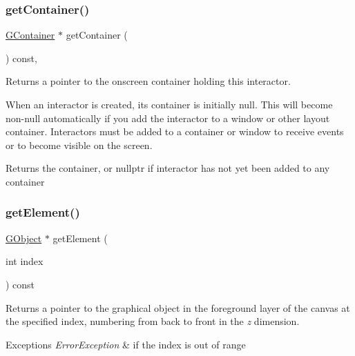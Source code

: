 \subsubsection{\texorpdfstring{get\+Container()}{getContainer()}}
{\footnotesize\ttfamily \mbox{\hyperlink{classGContainer}{G\+Container}} $\ast$ get\+Container (\begin{DoxyParamCaption}{ }\end{DoxyParamCaption}) const\hspace{0.3cm}{\ttfamily [virtual]}, {\ttfamily [inherited]}}



Returns a pointer to the onscreen container holding this interactor. 

When an interactor is created, its container is initially null. This will become non-\/null automatically if you add the interactor to a window or other layout container. Interactors must be added to a container or window to receive events or to become visible on the screen. \begin{DoxyReturn}{Returns}
the container, or nullptr if interactor has not yet been added to any container 
\end{DoxyReturn}
\mbox{\label{classGCanvas_abde388cc529d22bb5f7f4a54d56049d8}} 
\subsubsection{\texorpdfstring{get\+Element()}{getElement()}}
{\footnotesize\ttfamily \mbox{\hyperlink{classGObject}{G\+Object}} $\ast$ get\+Element (\begin{DoxyParamCaption}\item[{int}]{index }\end{DoxyParamCaption}) const\hspace{0.3cm}{\ttfamily [virtual]}}



Returns a pointer to the graphical object in the foreground layer of the canvas at the specified index, numbering from back to front in the {\itshape z} dimension. 


\begin{DoxyExceptions}{Exceptions}
{\em Error\+Exception} & if the index is out of range \\
\hline
\end{DoxyExceptions}
\mbox{\label{classGCanvas_a25efa999eca5790ec26ef091b05f961c}} 
